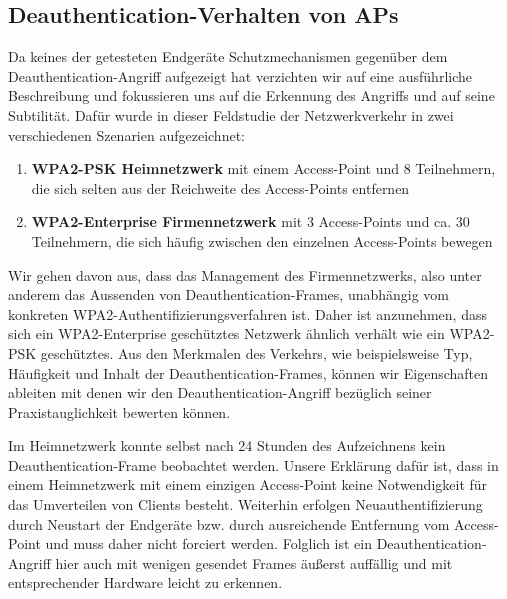 

\subsection{Deauthentication-Verhalten von APs}
Da keines der getesteten Endgeräte Schutzmechanismen gegenüber dem Deauthentication-Angriff aufgezeigt hat verzichten wir auf eine ausführliche Beschreibung und fokussieren uns auf die Erkennung des Angriffs und auf seine Subtilität.
Dafür wurde in dieser Feldstudie der Netzwerkverkehr in zwei verschiedenen Szenarien aufgezeichnet:
\begin{enumerate}
	\item \textbf{WPA2-PSK Heimnetzwerk} mit einem Access-Point und 8 Teilnehmern, die sich selten aus der Reichweite des Access-Points entfernen
	\item \textbf{WPA2-Enterprise Firmennetzwerk} mit 3 Access-Points und ca. 30 Teilnehmern, die sich häufig zwischen den einzelnen Access-Points bewegen
\end{enumerate}
Wir gehen davon aus, dass das Management des Firmennetzwerks, also unter anderem das Aussenden von Deauthentication-Frames, unabhängig vom konkreten WPA2-Authentifizierungsverfahren ist.
Daher ist anzunehmen, dass sich ein WPA2-Enterprise geschütztes Netzwerk ähnlich verhält wie ein WPA2-PSK geschütztes.
Aus den Merkmalen des Verkehrs, wie beispielsweise Typ, Häufigkeit und Inhalt der Deauthentication-Frames, können wir Eigenschaften ableiten mit denen wir den Deauthentication-Angriff bezüglich seiner Praxistauglichkeit bewerten können.

Im Heimnetzwerk konnte selbst nach 24 Stunden des Aufzeichnens kein Deauthentication-Frame beobachtet werden.
Unsere Erklärung dafür ist, dass in einem Heimnetzwerk mit einem einzigen Access-Point keine Notwendigkeit für das Umverteilen von Clients besteht.
Weiterhin erfolgen Neuauthentifizierung durch Neustart der Endgeräte bzw. durch ausreichende Entfernung vom Access-Point und muss daher nicht forciert werden.
Folglich ist ein Deauthentication-Angriff hier auch mit wenigen gesendet Frames äußerst auffällig und mit entsprechender Hardware leicht zu erkennen.

